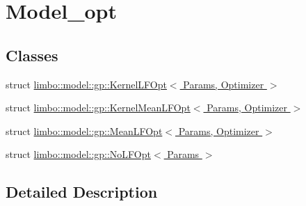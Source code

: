 \hypertarget{group__model__opt}{}\section{Model\+\_\+opt}
\label{group__model__opt}
\subsection*{Classes}
\begin{DoxyCompactItemize}
\item 
struct \hyperlink{structlimbo_1_1model_1_1gp_1_1_kernel_l_f_opt}{limbo\+::model\+::gp\+::\+Kernel\+L\+F\+Opt$<$ Params, Optimizer $>$}
\item 
struct \hyperlink{structlimbo_1_1model_1_1gp_1_1_kernel_mean_l_f_opt}{limbo\+::model\+::gp\+::\+Kernel\+Mean\+L\+F\+Opt$<$ Params, Optimizer $>$}
\item 
struct \hyperlink{structlimbo_1_1model_1_1gp_1_1_mean_l_f_opt}{limbo\+::model\+::gp\+::\+Mean\+L\+F\+Opt$<$ Params, Optimizer $>$}
\item 
struct \hyperlink{structlimbo_1_1model_1_1gp_1_1_no_l_f_opt}{limbo\+::model\+::gp\+::\+No\+L\+F\+Opt$<$ Params $>$}
\end{DoxyCompactItemize}


\subsection{Detailed Description}
